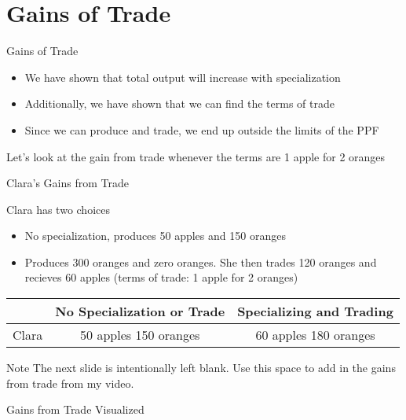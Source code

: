 \documentclass{beamer}
\begin{document}
\section{Gains of Trade}

\begin{frame}{Gains of Trade}

\begin{itemize}
\item We have shown that total output will increase with specialization
\item Additionally, we have shown that we can find the terms of trade
\item Since we can produce and trade, we end up outside the limits of the PPF
\end{itemize}

Let's look at the gain from trade whenever the terms are 1 apple for 2 oranges

\end{frame}

\begin{frame}{Clara's Gains from Trade}

\begin{exampleblock}

Clara has two choices
\begin{itemize}
\item No specialization, produces 50 apples and 150 oranges
\item Produces 300 oranges and zero oranges. She then trades 120 oranges and recieves 60 apples (terms of trade: 1 apple for 2 oranges)
\end{itemize}

\begin{tabular}{ | c | c c | }\hline
 & \textbf{No Specialization or Trade} & \textbf{Specializing and Trading} \\\hline
Clara & 50 apples 150 oranges & 60 apples 180 oranges \\\hline
\end{tabular}


\end{exampleblock}

\begin{alertblock}{Note}
The next slide is intentionally left blank. Use this space to add in the gains from trade from my video.
\end{alertblock}

\end{frame}

\begin{frame}{Gains from Trade Visualized}
\end{frame}
\end{document}
